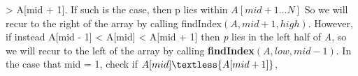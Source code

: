 \documentclass[11pt]{article}
\begin{document}
\begin{flushleft}
		\textgreater{ A[mid + 1]}. If such is the case, then p lies within $A[mid + 1 \dots N]$ So we will recur to the right of the array by calling findIndex$(A, mid + 1, high)$.
		However, if instead A[mid - 1] \textless{ A[mid]} \textless { A[mid + 1]} then \emph{p} lies in the left half of \emph{A}, so we will recur to the left of the array by calling
		\textbf{findIndex$(A, low, mid -1)$}.\newline\newline
		In the case that mid = 1, check if $A[mid] \textless { A[mid + 1]}$, 
		\vspace{0.2cm}
		
	\end{flushleft}
\end{document}
